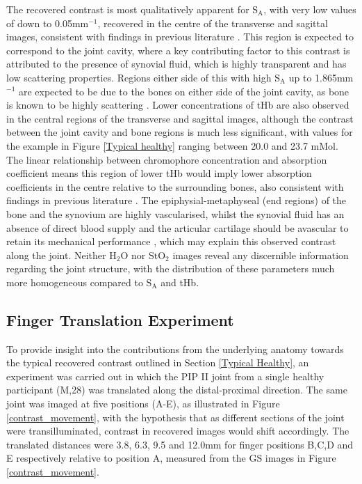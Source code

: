 \documentclass[twoside]{bhamthesis}
\theoremstyle{definition}
\begin{document}
The recovered contrast is most qualitatively apparent for $\mathrm{S_A}$, with very low values of down to 0.05mm$^{-1}$, recovered in the centre of the transverse and sagittal images, consistent with findings in previous literature \cite{montejo2013computer,yuan2010image}. This region is expected to correspond to the joint cavity, where a key contributing factor to this contrast is attributed to the presence of synovial fluid, which is highly transparent and has low scattering properties. Regions either side of this with high $\mathrm{S_A}$ up to 1.865mm$^{-1}$ are expected to be due to the bones on either side of the joint cavity, as bone is known to be highly scattering \cite{alexandrakis2005tomographic}. Lower concentrations of tHb are also observed in the central regions of the transverse and sagittal images, although the contrast between the joint cavity and bone regions is much less significant, with values for the example in Figure \ref{Typical healthy} ranging between 20.0 and 23.7 mMol. The linear relationship between chromophore concentration and absorption coefficient means this region of lower tHb would imply lower absorption coefficients in the centre relative to the surrounding bones, also consistent with findings in previous literature \cite{montejo2013computer,yuan2010image}. The epiphysial-metaphyseal (end regions) of the bone and the synovium are highly vascularised, whilst the synovial fluid has an absence of direct blood supply and the articular cartilage should be avascular to retain its mechanical performance \cite{haywood2001vasculature}, which may explain this observed contrast along the joint. Neither $\mathrm{H_2O}$ nor $\mathrm{StO_2}$ images reveal any discernible information regarding the joint structure, with the distribution of these parameters much more homogeneous compared to $\mathrm{S_A}$ and tHb. 

\subsection{Finger Translation Experiment}

To provide insight into the contributions from the underlying anatomy towards the typical recovered contrast outlined in Section \ref{Typical Healthy}, an experiment was carried out in which the PIP II joint from a single healthy participant (M,28) was translated along the distal-proximal direction. The same joint was imaged at five positions (A-E), as illustrated in Figure \ref{contrast_movement}, with the hypothesis that as different sections of the joint were transilluminated, contrast in recovered images would shift accordingly. The translated distances were 3.8, 6.3, 9.5 and 12.0mm for finger positions B,C,D and E respectively relative to position A, measured from the GS images in Figure \ref{contrast_movement}.
\end{document}
